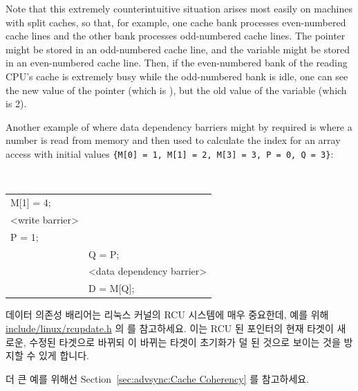 \begin{enumerate}
Note that this extremely counterintuitive situation arises most easily on
machines with split caches, so that, for example, one cache bank processes
even-numbered cache lines and the other bank processes odd-numbered cache
lines.
The pointer  might be stored in an odd-numbered cache line, and the
variable  might be stored in an even-numbered cache line.  Then, if the
even-numbered bank of the reading CPU's cache is extremely busy while the
odd-numbered bank is idle, one can see the new value of the
pointer  (which is ),
but the old value of the variable  (which is 2).

Another example of where data dependency barriers might by required is where a
number is read from memory and then used to calculate the index for an array
access with initial values
{\tt \{M[0] = 1, M[1] = 2, M[3] = 3, P = 0, Q = 3\}}:
\fi

\vspace{5pt}
\begin{minipage}[t]{\columnwidth}
\tt
\scriptsize
\begin{tabular}{l|p{1.5in}}
	\nf{CPU 1} &	\nf{CPU 2} \\
	\hline
	M[1] = 4; & \\
	<write barrier> & \\
	P = 1;	&	\\
		&	Q = P; \\
		&	<data dependency barrier> \\
		&	D = M[Q]; \\
\end{tabular}
\end{minipage}
\vspace{5pt}

데이터 의존성 배리어는 리눅스 커널의 RCU 시스템에 매우 중요한데, 예를 위해
\url{include/linux/rcupdate.h} 의  를 참고하세요.
이는 RCU 된 포인터의 현재 타겟이 새로운, 수정된 타겟으로 바뀌되 이 바뀌는
타겟이 초기화가 덜 된 것으로 보이는 것을 방지할 수 있게 합니다.

더 큰 예를 위해선 Section~\ref{sec:advsync:Cache Coherency} 를 참고하세요.

\end{enumerate}
